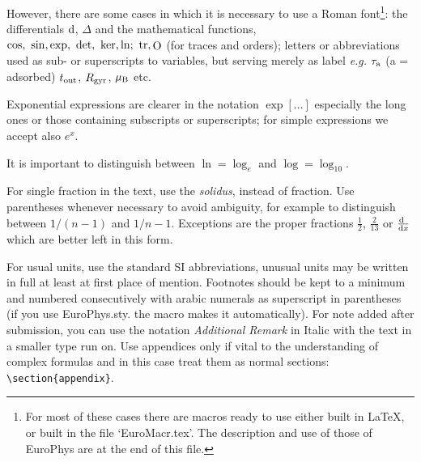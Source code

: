 However, there are some cases in which it is necessary to use a Roman
font\footnote{For most of these cases there are macros ready to use either
built in \LaTeX, or built in the file  `EuroMacr.tex'. The description and 
use of those of EuroPhys  are at the end of this file.}: the differentials
${\rm d}$, $\Delta$ and the mathematical functions, $\cos,\ \sin, 
\exp,\ \det,\
\ker, \ln;\ \mathop{\rm tr}\nolimits, \mathop{\rm O}\nolimits$ (for traces and orders); letters or
abbreviations used as sub- or superscripts to variables, but serving
merely as label {\it e.g.\/} $\tau_{\rm a}$ (a = adsorbed) $t_{\rm
out}$, $R_{\rm gyr}$, $\mu_{\rm B}$ etc.

Exponential expressions are clearer in the notation $\exp[\ldots]$
especially the long ones or those containing subscripts or superscripts;
for simple expressions we accept also $e^x$.

It is important to distinguish between $\ln=\log_e$ and $\log=\log_{10}$.

For single fraction in the text, use the {\it solidus\/}, instead of
fraction. Use parentheses whenever necessary to avoid ambiguity, for
example to distinguish between $1/(n-1)$ and $1/n-1$. Exceptions are the
proper fractions $\frac12$, $\frac2{13}$ or $\frac{{\rm d}\ }{{\rm d} x}$ which are
better left in this form.

For usual units, use the standard SI abbreviations, unusual units may
be written in full at least at first place of mention. Footnotes should
be kept to a minimum and numbered consecutively with arabic numerals as
superscript in parentheses (if you use EuroPhys.sty. the 
macro makes it automatically).
For note added after submission, you can use the notation {\it Additional
Remark\/} in Italic with the text in a smaller type run on.
Use appendices only if vital to the understanding of complex formulas and
in this case treat them as normal sections: {\tt \verb!\section{appendix}!}.

%
%
%


